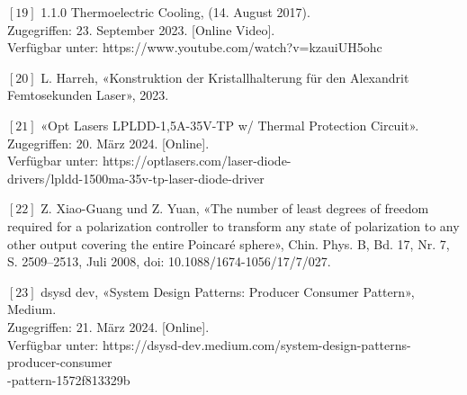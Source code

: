 $[19]$	1.1.0 Thermoelectric Cooling, (14. August 2017).\\
Zugegriffen: 23. September 2023. [Online Video].\\
Verfügbar unter: https://www.youtube.com/watch?v=kzauiUH5ohc

$[20]$	L. Harreh, «Konstruktion der Kristallhalterung für den Alexandrit Femtosekunden Laser», 2023.

$[21]$	«Opt Lasers LPLDD-1,5A-35V-TP w/ Thermal Protection Circuit».\\
Zugegriffen: 20. März 2024. [Online].\\
Verfügbar unter: https://optlasers.com/laser-diode-\\
drivers/lpldd-1500ma-35v-tp-laser-diode-driver

$[22]$ Z. Xiao-Guang und Z. Yuan, «The number of least degrees of freedom required for a polarization controller to transform any state of polarization to any other output covering the entire Poincaré sphere», Chin. Phys. B, Bd. 17, Nr. 7, S. 2509–2513, Juli 2008, doi: 10.1088/1674-1056/17/7/027.

$[23]$  dsysd dev, «System Design Patterns: Producer Consumer Pattern», Medium.\\
Zugegriffen: 21. März 2024. [Online].\\
Verfügbar unter: https://dsysd-dev.medium.com/system-design-patterns-producer-consumer\\
-pattern-1572f813329b